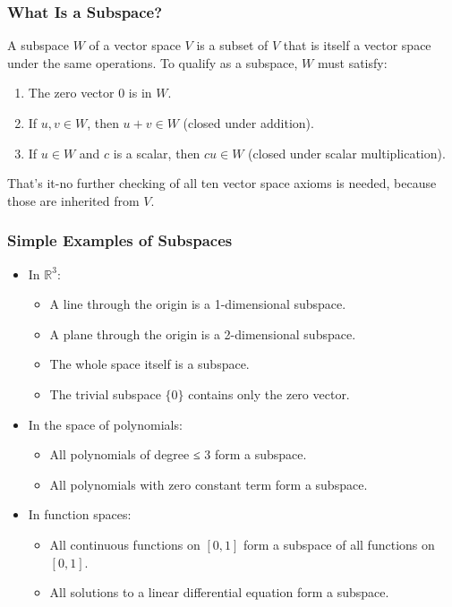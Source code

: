 \documentclass[
  letterpaper,
  DIV=11,
  numbers=noendperiod]{scrreprt}
\providecommand{\tightlist}{%
  \setlength{\itemsep}{0pt}\setlength{\parskip}{0pt}}
\begin{document}
\subsubsection{What Is a Subspace?}\label{what-is-a-subspace}

A subspace \(W\) of a vector space \(V\) is a subset of \(V\) that is
itself a vector space under the same operations. To qualify as a
subspace, \(W\) must satisfy:

\begin{enumerate}
\def\labelenumi{\arabic{enumi}.}
\tightlist
\item
  The zero vector \(0\) is in \(W\).
\item
  If \(u, v \in W\), then \(u+v \in W\) (closed under addition).
\item
  If \(u \in W\) and \(c\) is a scalar, then \(cu \in W\) (closed under
  scalar multiplication).
\end{enumerate}

That's it-no further checking of all ten vector space axioms is needed,
because those are inherited from \(V\).

\subsubsection{Simple Examples of
Subspaces}\label{simple-examples-of-subspaces}

\begin{itemize}
\item
  In \(\mathbb{R}^3\):

  \begin{itemize}
  \tightlist
  \item
    A line through the origin is a 1-dimensional subspace.
  \item
    A plane through the origin is a 2-dimensional subspace.
  \item
    The whole space itself is a subspace.
  \item
    The trivial subspace \(\{0\}\) contains only the zero vector.
  \end{itemize}
\item
  In the space of polynomials:

  \begin{itemize}
  \tightlist
  \item
    All polynomials of degree ≤ 3 form a subspace.
  \item
    All polynomials with zero constant term form a subspace.
  \end{itemize}
\item
  In function spaces:

  \begin{itemize}
  \tightlist
  \item
    All continuous functions on \([0,1]\) form a subspace of all
    functions on \([0,1]\).
  \item
    All solutions to a linear differential equation form a subspace.
  \end{itemize}
\end{itemize}
\end{document}
